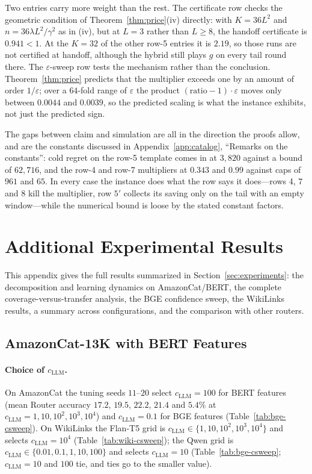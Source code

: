 \documentclass[anon]{alt2027} %
\newcommand{\eps}{\varepsilon}
\begin{document}
Two entries carry more weight than the rest. The certificate row checks the
geometric condition of Theorem~\ref{thm:price}(iv) directly: with $K=36L^2$
and $n=36\lambda L^2/\gamma^2$ as in (iv), but at $L=3$ rather than $L\ge8$, the
handoff certificate is $0.941<1$. At the $K=32$ of the other row-5 entries it
is $2.19$, so those runs are not certified at handoff, although the hybrid
still plays $g$ on every tail round there. The $\eps$-sweep row tests the
mechanism rather than the conclusion. Theorem~\ref{thm:price} predicts that
the multiplier exceeds one by an amount of order $1/\eps$; over a $64$-fold
range of $\eps$ the product $(\text{ratio}-1)\cdot\eps$ moves only between
$0.0044$ and $0.0039$, so the predicted scaling is what the instance exhibits,
not just the predicted sign.

The gaps between claim and simulation are all in the direction the proofs
allow, and are the constants discussed in
Appendix~\ref{app:catalog}, ``Remarks on the constants'': cold regret on the
row-5 template comes in at $3{,}820$ against a bound of $62{,}716$, and the
row-4 and row-7 multipliers at $0.343$ and $0.99$ against caps of $961$ and
$65$. In every case the instance does what the row says it does---rows 4, 7
and 8 kill the multiplier, row $5'$ collects its saving only on the tail with
an empty window---while the numerical bound is loose by the stated constant
factors.

\section{Additional Experimental Results}
\label{app:more-exp}

This appendix gives the full results summarized in Section~\ref{sec:experiments}:
the decomposition and learning dynamics on AmazonCat/BERT, the complete
coverage-versus-transfer analysis, the BGE confidence sweep, the WikiLinks
results, a summary across configurations, and the comparison with other
routers.

\subsection{AmazonCat-13K with BERT Features}
\label{app:amazon-bert}

\paragraph{Choice of $c_{\mathrm{LLM}}$.} On AmazonCat the tuning seeds $11$--$20$ select
$c_{\mathrm{LLM}}=100$ for BERT features (mean Router accuracy $17.2$, $19.5$, $22.2$, $21.4$
and $5.4\%$ at $c_{\mathrm{LLM}}=1,10,10^2,10^3,10^4$) and $c_{\mathrm{LLM}}=0.1$ for BGE features
(Table~\ref{tab:bge-csweep}). On WikiLinks the Flan-T5 grid is
$c_{\mathrm{LLM}}\in\{1,10,10^2,10^3,10^4\}$ and selects $c_{\mathrm{LLM}}=10^4$
(Table~\ref{tab:wiki-csweep}); the Qwen grid is
$c_{\mathrm{LLM}}\in\{0.01,0.1,1,10,100\}$ and selects $c_{\mathrm{LLM}}=10$
(Table~\ref{tab:bge-csweep}; $c_{\mathrm{LLM}}=10$ and $100$ tie, and ties go to the
smaller value).
\end{document}
